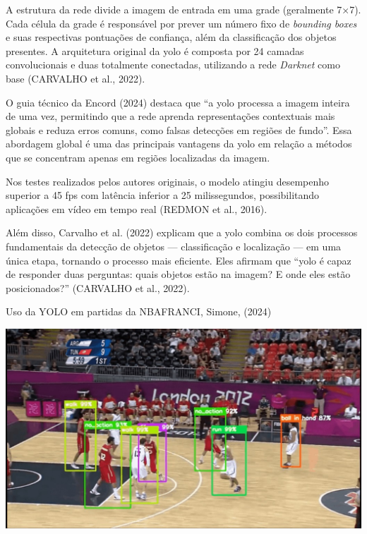 A estrutura da rede divide a imagem de entrada em uma grade (geralmente 7×7). Cada célula da grade é responsável por prever um número fixo de \textit{bounding boxes} e suas respectivas pontuações de confiança, além da classificação dos objetos presentes. 
A arquitetura original da \ac{yolo} é composta por 24 camadas convolucionais e duas totalmente conectadas, utilizando a rede \textit{Darknet} como base (CARVALHO et al., 2022).

O guia técnico da Encord (2024) destaca que ``a \ac{yolo} processa a imagem inteira de uma vez, permitindo que a rede aprenda representações contextuais mais globais e reduza erros comuns, como falsas detecções em regiões de fundo''. 
Essa abordagem global é uma das principais vantagens da \ac{yolo} em relação a métodos que se concentram apenas em regiões localizadas da imagem.

Nos testes realizados pelos autores originais, o modelo atingiu desempenho superior a 45 \ac{fps} com latência inferior a 25 milissegundos, possibilitando aplicações em vídeo em tempo real (REDMON et al., 2016).

Além disso, Carvalho et al. (2022) explicam que a \ac{yolo} combina os dois processos fundamentais da detecção de objetos — classificação e localização — em uma única etapa, tornando o processo mais eficiente. 
Eles afirmam que ``\ac{yolo} é capaz de responder duas perguntas: quais objetos estão na imagem? E onde eles estão posicionados?'' (CARVALHO et al., 2022).

\begin{figura}{Uso da YOLO em partidas da NBA}{FRANCI, Simone, (2024)}
    \begin{flushleft}
        \label{fig:NBA}
        \includegraphics[width=0.7\linewidth]{resources/floats/ilustracoes/NBA.jpg}
    \end{flushleft}
\end{figura}
\FloatBarrier

